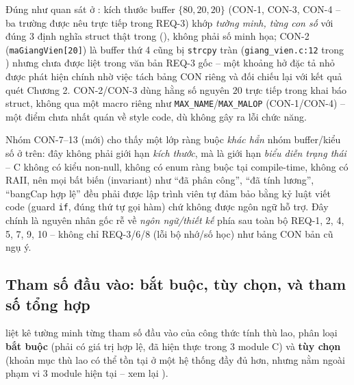 Đúng như quan sát ở : kích thước buffer $\{80, 20, 20\}$ (CON-1, CON-3, CON-4 -- ba trường được nêu trực tiếp trong REQ-3) khớp \emph{tường minh, từng con số} với đúng 3 định nghĩa struct thật trong  (), không phải số minh họa; CON-2 (\texttt{maGiangVien[20]}) là buffer thứ 4 cũng bị \texttt{strcpy} tràn (\texttt{giang\_vien.c:12} trong ) nhưng chưa được liệt trong văn bản REQ-3 gốc -- một khoảng hở đặc tả nhỏ được phát hiện chính nhờ việc tách bảng CON riêng và đối chiếu lại với kết quả quét Chương 2. CON-2/CON-3 dùng hằng số nguyên $20$ trực tiếp trong khai báo struct, không qua một macro riêng như \texttt{MAX\_NAME}/\texttt{MAX\_MALOP} (CON-1/CON-4) -- một điểm chưa nhất quán về style code, dù không gây ra lỗi chức năng.

Nhóm CON-7--13 (mới) cho thấy một lớp ràng buộc \emph{khác hẳn} nhóm buffer/kiểu số ở trên: đây không phải giới hạn \emph{kích thước}, mà là giới hạn \emph{biểu diễn trạng thái} -- C không có kiểu non-null, không có enum ràng buộc tại compile-time, không có RAII, nên mọi bất biến (invariant) như ``đã phân công'', ``đã tính lương'', ``bangCap hợp lệ'' đều phải được lập trình viên tự đảm bảo bằng kỷ luật viết code (guard \texttt{if}, đúng thứ tự gọi hàm) chứ không được ngôn ngữ hỗ trợ. Đây chính là nguyên nhân gốc rễ về \emph{ngôn ngữ/thiết kế} phía sau toàn bộ REQ-1, 2, 4, 5, 7, 9, 10 -- không chỉ REQ-3/6/8 (lỗi bộ nhớ/số học) như bảng CON bản cũ ngụ ý.

\subsection{Tham số đầu vào: bắt buộc, tùy chọn, và tham số tổng hợp}
\label{sec:params}

 liệt kê tường minh từng tham số đầu vào của công thức tính thù lao, phân loại \textbf{bắt buộc} (phải có giá trị hợp lệ, đã hiện thực trong 3 module C) và \textbf{tùy chọn} (khoản mục thù lao có thể tồn tại ở một hệ thống đầy đủ hơn, nhưng nằm ngoài phạm vi 3 module hiện tại -- xem lại ).

